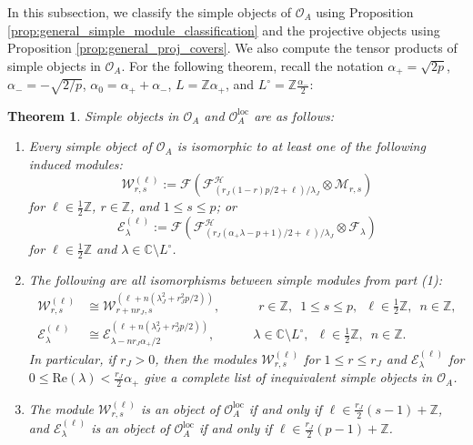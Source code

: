 \documentclass[11pt, reqno]{amsart}
\newtheorem{thm}{Theorem}[section]
\theoremstyle{definition}\newtheorem{defi}[thm]{Definition}
\theoremstyle{definition}\newtheorem{rem}[thm]{Remark}
\theoremstyle{definition}\newtheorem{exam}[thm]{Example}
\theoremstyle{definition}\newtheorem{assum}[thm]{Assumption}
\newcommand{\cE}{\mathcal{E}}
\newcommand{\cH}{\mathcal{H}}
\newcommand{\cM}{\mathcal{M}}
\newcommand{\cF}{\mathcal{F}}
\newcommand{\cO}{\mathcal{O}}
\newcommand{\cW}{\mathcal{W}}
\newcommand{\CC}{\mathbb{C}}
\newcommand{\ZZ}{\mathbb{Z}}
\newcommand{\Oloc}{\cO^{\mathrm{loc}}}
\begin{document}
 In this subsection, we classify the simple objects of $\cO_A$ using Proposition \ref{prop:general_simple_module_classification} and the projective objects using Proposition \ref{prop:general_proj_covers}. We also compute the tensor products of simple objects in $\cO_A$. For the following theorem, recall the notation $\alpha_+=\sqrt{2p}$, $\alpha_-=-\sqrt{2/p}$, $\alpha_0=\alpha_++\alpha_-$, $L=\ZZ\alpha_+$, and $L^\circ=\ZZ\frac{\alpha_-}{2}$:
\begin{thm}\label{thm:simple_A-module_classification}
Simple objects in $\cO_A$ and $\Oloc_A$ are as follows:
\begin{enumerate}
\item Every simple object of $\cO_A$ is isomorphic to at least one of the following induced modules:
\begin{equation*}
\cW^{(\ell)}_{r,s} := \cF\left(\cF^\cH_{(r_J(1-r)p/2+\ell)/\lambda_J}\otimes\cM_{r,s}\right)
\end{equation*}
for $\ell\in\frac{1}{2}\ZZ$, $r\in\ZZ$, and $1\leq s\leq p$; or
\begin{equation*}
\cE^{(\ell)}_\lambda := \cF\left(\cF^\cH_{(r_J(\alpha_+\lambda-p+1)/2+\ell)/\lambda_J}\otimes\cF_\lambda\right)
\end{equation*}
for $\ell\in\frac{1}{2}\ZZ$ and $\lambda\in\CC\setminus L^\circ$.

\item The following are all isomorphisms between simple modules from part (1):
\begin{align*}
\cW_{r,s}^{(\ell)} & \cong \cW_{r+nr_J,s}^{(\ell+n(\lambda_J^2+r_J^2p/2))},\qquad\quad r\in\ZZ, \,\,\, 1\leq s\leq p,\,\,\, \ell\in\frac{1}{2}\ZZ,\,\,\, n\in\ZZ,\\
\cE^{(\ell)}_\lambda & \cong \cE_{\lambda-nr_J\alpha_+/2}^{(\ell+n(\lambda_J^2+r_J^2 p/2))}, \qquad\quad \lambda\in\CC\setminus L^\circ,\,\,\, \ell\in\frac{1}{2}\ZZ,\,\,\, n\in\ZZ.
\end{align*}
In particular, if $r_J>0$, then the modules $\cW_{r,s}^{(\ell)}$ for $1\leq r\leq r_J$ and $\cE^{(\ell)}_\lambda$ for $0\leq\mathrm{Re}(\lambda)<\frac{r_J}{2}\alpha_+$ give a complete list of inequivalent simple objects in $\cO_A$.

\item The module $\cW_{r,s}^{(\ell)}$ is an object of $\Oloc_A$ if and only if $\ell\in \frac{r_J}{2}(s-1)+\ZZ$, and $\cE_\lambda^{(\ell)}$ is an object of $\Oloc_A$ if and only if $\ell\in \frac{r_J}{2}(p-1)+\ZZ$.

\end{enumerate}
\end{thm}
\end{document}
